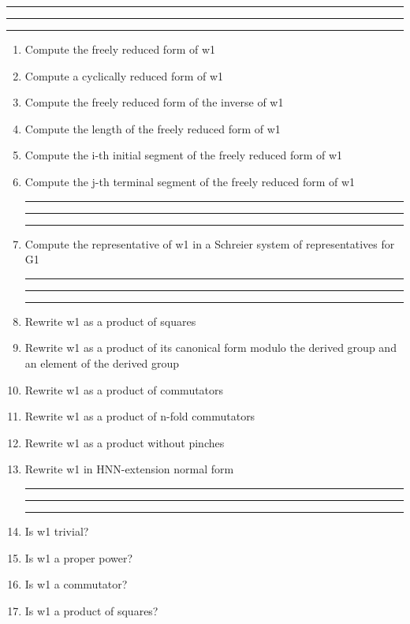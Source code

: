 
\bigskip
\hrule\hrule\hrule

\begin{enumerate}

\item Compute the freely reduced form of w1

\item Compute a cyclically reduced form of w1

\item Compute the freely reduced form of the inverse of w1

\item Compute the length of the freely reduced form of w1

\item Compute the i-th initial segment of the freely reduced form of w1

\item Compute the j-th terminal segment of the freely reduced form of w1

\bigskip
\hrule\hrule\hrule

\item Compute the representative of w1 in a Schreier system of representatives for
G1


\bigskip
\hrule\hrule\hrule

\item Rewrite w1 as a product of squares

\item Rewrite w1 as a product of its canonical form modulo the derived group
and an element of the derived group

\item Rewrite w1 as a product of commutators

\item Rewrite w1 as a product of n-fold commutators

\item Rewrite w1 as a product without pinches

\item Rewrite w1 in HNN-extension normal form
\bigskip
\hrule\hrule\hrule

\item Is w1 trivial?

\item Is w1 a proper power?

\item Is w1 a commutator?

\item Is w1 a product of squares?


\end{enumerate}
